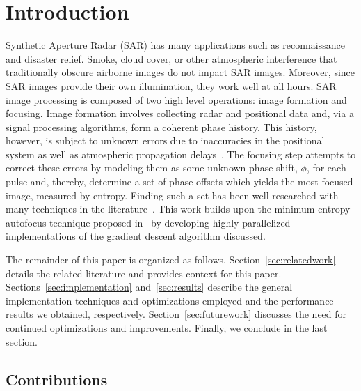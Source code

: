 \section{Introduction}\label{sec:introduction}

Synthetic Aperture Radar (SAR) has many applications such as reconnaissance and
disaster relief. Smoke, cloud cover, or other atmospheric interference that
traditionally obscure airborne images do not impact SAR images.  Moreover,
since SAR images provide their own illumination, they work well at all hours. 
SAR image processing is composed of two high level operations: image formation
and focusing. Image formation involves collecting radar and positional data
and, via a signal processing algorithms, form a coherent phase history.  This
history, however, is subject to unknown errors due to inaccuracies in the
positional system as well as atmospheric propagation
delays~\cite{ash2012autofocus}. The focusing step attempts to correct these
errors by modeling them as some unknown phase shift, $\phi$, for each pulse
and, thereby, determine a set of phase offsets which yields the most focused
image, measured by entropy. Finding such a set has been well researched with
many techniques in the literature~\cite{kragh2006monotonic, ash2012autofocus,
kragh2009minimum, wahl1994phase, morrison2007sar, Eichel:89,
less_mem_high_eff_autofocus}. This work builds upon the minimum-entropy
autofocus technique proposed in~\cite{kragh2006monotonic} by developing highly
parallelized implementations of the gradient descent algorithm discussed.


The remainder of this paper is organized as follows.
Section~\ref{sec:relatedwork} details the related literature and provides
context for this paper. Sections~\ref{sec:implementation} and~\ref{sec:results}
describe the general implementation techniques and optimizations employed and
the performance results we obtained, respectively. Section~\ref{sec:futurework}
discusses the need for continued optimizations and improvements. Finally, we
conclude in the last section.

\subsection{Contributions}

